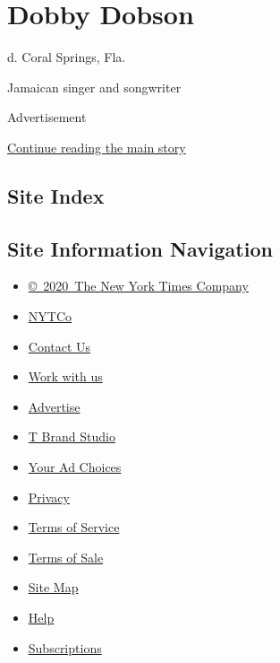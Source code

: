\hypertarget{dobby-dobson}{%
\section{Dobby Dobson}\label{dobby-dobson}}

d. Coral Springs, Fla.

Jamaican singer and songwriter

Advertisement

\protect\hyperlink{after-bottom}{Continue reading the main story}

\hypertarget{site-index}{%
\subsection{Site Index}\label{site-index}}

\hypertarget{site-information-navigation}{%
\subsection{Site Information
Navigation}\label{site-information-navigation}}

\begin{itemize}
\tightlist
\item
  \href{https://help.nytimes3xbfgragh.onion/hc/en-us/articles/115014792127-Copyright-notice}{©~2020~The
  New York Times Company}
\end{itemize}

\begin{itemize}
\tightlist
\item
  \href{https://www.nytco.com/}{NYTCo}
\item
  \href{https://help.nytimes3xbfgragh.onion/hc/en-us/articles/115015385887-Contact-Us}{Contact
  Us}
\item
  \href{https://www.nytco.com/careers/}{Work with us}
\item
  \href{https://nytmediakit.com/}{Advertise}
\item
  \href{http://www.tbrandstudio.com/}{T Brand Studio}
\item
  \href{https://www.nytimes3xbfgragh.onion/privacy/cookie-policy\#how-do-i-manage-trackers}{Your
  Ad Choices}
\item
  \href{https://www.nytimes3xbfgragh.onion/privacy}{Privacy}
\item
  \href{https://help.nytimes3xbfgragh.onion/hc/en-us/articles/115014893428-Terms-of-service}{Terms
  of Service}
\item
  \href{https://help.nytimes3xbfgragh.onion/hc/en-us/articles/115014893968-Terms-of-sale}{Terms
  of Sale}
\item
  \href{https://spiderbites.nytimes3xbfgragh.onion}{Site Map}
\item
  \href{https://help.nytimes3xbfgragh.onion/hc/en-us}{Help}
\item
  \href{https://www.nytimes3xbfgragh.onion/subscription?campaignId=37WXW}{Subscriptions}
\end{itemize}
